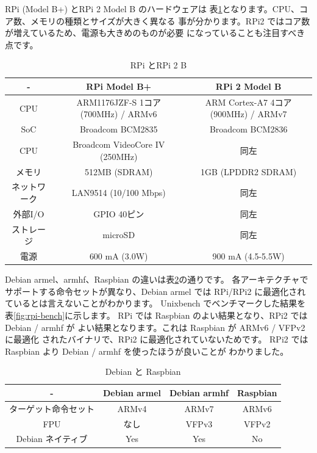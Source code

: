 \documentclass[mingoth,a4paper]{jsarticle}
\begin{document}
RPi (Model B+) とRPi 2 Model B のハードウェアは
表\ref{fig:rpi-hw}となります。CPU、コア数、メモリの種類とサイズが大きく異なる
事が分かります。RPi2 ではコア数が増えているため、電源も大きめのものが必要
になっていることも注目すべき点です。
\begin{table}
\caption{RPi とRPi 2 B}
\begin{center}
\begin{tabular}{|c|c|c|}
\hline
-   & RPi Model B+ & RPi 2 Model B \\
\hline
CPU  & ARM1176JZF-S 1コア (700MHz) / ARMv6 & ARM Cortex-A7 4コア (900MHz) / ARMv7\\
SoC  & Broadcom BCM2835 &  Broadcom BCM2836 \\  
CPU  & Broadcom VideoCore IV (250MHz) & 同左 \\
メモリ & 512MB (SDRAM)& 1GB (LPDDR2 SDRAM) \\
ネットワーク & LAN9514 (10/100 Mbps) & 同左 \\
外部I/O & GPIO 40ピン & 同左 \\
ストレージ & microSD & 同左 \\
電源 & 600 mA (3.0W) & 900 mA (4.5-5.5W) \\
\hline
\end{tabular}
\label{fig:rpi-hw}
\end{center}
\end{table}

Debian armel、armhf、Raspbian の違いは表\ref{fig:rpi-sw}の通りです。
各アーキテクチャでサポートする命令セットが異なり、Debian armel
では RPi/RPi2 に最適化されているとは言えないことがわかります。
Unixbench でベンチマークした結果を表\ref{fig:rpi-bench}に示します。
RPi では Raspbian のよい結果となり、RPi2 では Debian / armhf が
よい結果となります。これは Raspbian が ARMv6 / VFPv2 に最適化
されたバイナリで、RPi2 に最適化されていないためです。
RPi2 では Raspbian より Debian / armhf を使ったほうが良いことが
わかりました。

\begin{table}
\caption{Debian と Raspbian}
\begin{center}
\begin{tabular}{|c|c|c|c|}
\hline
 - & Debian armel & Debian armhf & Raspbian \\
\hline
ターゲット命令セット &  ARMv4 & ARMv7 & ARMv6 \\
FPU &  なし &  VFPv3  &  VFPv2 \\
Debian ネイティブ & Yes & Yes & No \\
\hline
\end{tabular}
\end{center}
\label{fig:rpi-sw}
\end{table}
\end{document}
